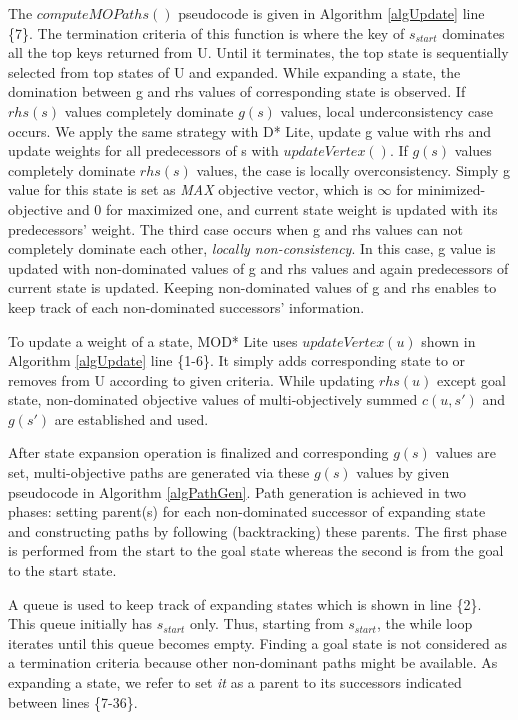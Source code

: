 The $computeMOPaths()$ pseudocode is given in Algorithm \ref{algUpdate} line \{7\}. The termination criteria of this function is where the key of $s_{start}$ dominates all the top keys returned from U. Until it terminates, the top state is sequentially selected from top states of U and expanded. While expanding a state, the domination between g and rhs values of corresponding state is observed. If $rhs(s)$ values completely dominate $g(s)$ values, local underconsistency case occurs. We apply the same strategy with D* Lite, update g value with rhs and update weights for all predecessors of s with $updateVertex()$. If $g(s)$ values completely dominate $rhs(s)$ values, the case is locally overconsistency. Simply g value for this state is set as \textit{MAX} objective vector, which is $\infty$ for minimized-objective and $0$ for maximized one, and current state weight is updated with its predecessors' weight. The third case occurs when g and rhs values can not completely dominate each other, \textit{locally non-consistency}. In this case, g value is updated with non-dominated values of g and rhs values and again predecessors of current state is updated. Keeping non-dominated values of g and rhs enables to keep track of each non-dominated successors' information.

To update a weight of a state, MOD* Lite uses $updateVertex(u)$ shown in Algorithm \ref{algUpdate} line \{1-6\}. It simply adds corresponding state to or removes from U according to given criteria. While updating $rhs(u)$ except goal state, non-dominated objective values of multi-objectively summed $c(u,s')$ and $g(s')$ are established and used.

After state expansion operation is finalized and corresponding $g(s)$ values are set, multi-objective paths are generated via these $g(s)$ values by given pseudocode in Algorithm \ref{algPathGen}. Path generation is achieved in two phases: setting parent(s) for each non-dominated successor of expanding state and constructing paths by following (backtracking) these parents. The first phase is performed from the start to the goal state whereas the second is from the goal to the start state. 

A queue is used to keep track of expanding states which is shown in line \{2\}. This queue initially has $s_{start}$ only. Thus, starting from $s_{start}$, the while loop iterates until this queue becomes empty. Finding a goal state is not considered as a termination criteria because other non-dominant paths might be available. As expanding a state, we refer to set \textit{it} as a parent to its successors indicated between lines \{7-36\}.

